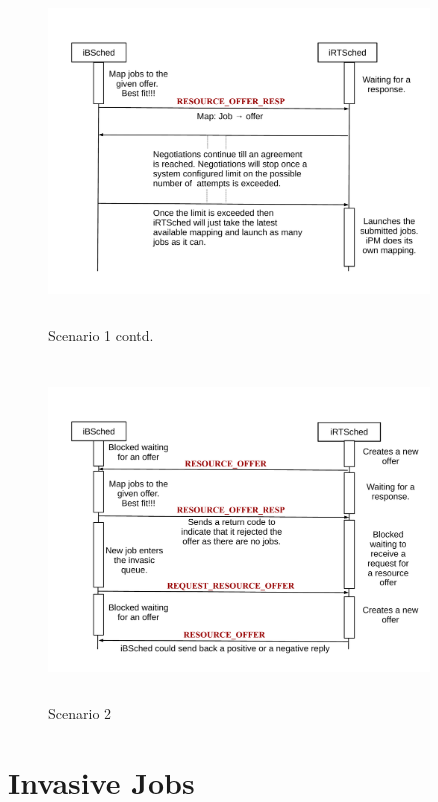 \begin{figure}[!t]
\vspace{-0.25in}
\centering
\includegraphics[width=0.9\textwidth, height=90mm]{./figures/scenario1contd.pdf}
\caption{Scenario 1 contd.}
\label{fig:Seq1}
\end{figure}
\begin{figure}[!b]
\centering
\includegraphics[width=0.9\textwidth, height=90mm]{./figures/scenario2.pdf}
\caption{Scenario 2}
\label{fig:Seq2}
\end{figure}
\section{Invasive Jobs}
